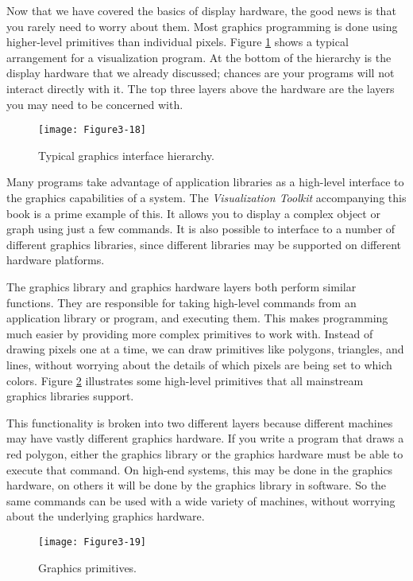 Now that we have covered the basics of display hardware, the good news is that you rarely need to worry about them. Most graphics programming is done using higher-level primitives than individual pixels. Figure \ref{fig:Figure3-18} shows a typical arrangement for a visualization program. At the bottom of the hierarchy is the display hardware that we already discussed; chances are your programs will not interact directly with it. The top three layers above the hardware are the layers you may need to be concerned with.

\begin{figure}[!htb]
  \centering
  \texttt{[image: Figure3-18]}\\
  \caption{Typical graphics interface hierarchy.}\label{fig:Figure3-18}
\end{figure}

Many programs take advantage of application libraries as a high-level interface to the graphics capabilities of a system. The \emph{Visualization Toolkit} accompanying this book is a prime example of this. It allows you to display a complex object or graph using just a few commands. It is also possible to interface to a number of different graphics libraries, since different libraries may be supported on different hardware platforms.

The graphics library and graphics hardware layers both perform similar functions. They are responsible for taking high-level commands from an application library or program, and executing them. This makes programming much easier by providing more complex primitives to work with. Instead of drawing pixels one at a time, we can draw primitives like polygons, triangles, and lines, without worrying about the details of which pixels are being set to which colors. Figure \ref{fig:Figure3-19} illustrates some high-level primitives that all mainstream graphics libraries support.

This functionality is broken into two different layers because different machines may have vastly different graphics hardware. If you write a program that draws a red polygon, either the graphics library or the graphics hardware must be able to execute that command. On high-end systems, this may be done in the graphics hardware, on others it will be done by the graphics library in software. So the same commands can be used with a wide variety of machines, without worrying about the underlying graphics hardware.

\begin{figure}[!htb]
  \centering
  \texttt{[image: Figure3-19]}\\
  \caption{Graphics primitives.}\label{fig:Figure3-19}
\end{figure}

